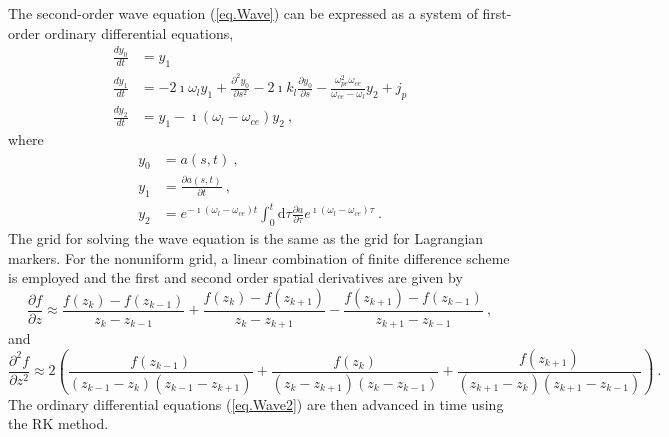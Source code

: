 \documentclass[times,12pt,3p,longtitle]{elsarticle}
\begin{document}
The second-order wave equation (\ref{eq.Wave}) can be expressed as a system of first-order ordinary differential equations,
\begin{equation}\label{eq.Wave2}
    \begin{aligned}
        \frac{d y_0}{d t} & = y_1 %
        \\
        \frac{d y_1}{d t} & =-2 \imath \omega_l y_1+\frac{\partial^2 y_0}{\partial s^2}-2 \imath k_l \frac{\partial y_0}{\partial s}- \frac{\omega_{pe}^2\omega_{ce}}{\omega_{ce}-\omega_l}y_{2} +j_p\\
        \frac{d y_2}{d t} & =y_1-\imath\left(\omega_l-\omega_{ce}\right) y_2~,
        \end{aligned}
\end{equation}
where 
\begin{equation}
    \begin{aligned}
        y_0 &= a(s,t)~,
        \\
        y_1 &= \frac{\partial a(s,t)}{\partial t}~,
        \\
        y_2 &= e^{-\imath(\omega_l-\omega_{ce})t} \int_0^t\mathrm{d}\tau \frac{\partial a}{\partial \tau} e^{\imath(\omega_l-\omega_{ce})\tau}~.
    \end{aligned}
\end{equation}
The grid for solving the wave equation is the same as the grid for Lagrangian markers.
For the nonuniform grid, 
a linear combination of finite difference scheme is employed and the first and second order spatial derivatives are given by 
\begin{equation}
    \frac{\partial f}{\partial z} \approx \frac{f(z_k) - f(z_{k-1})}{z_k-z_{k-1}} + \frac{f(z_k) - f(z_{k+1})}{z_k - z_{k+1}} - \frac{f(z_{k+1}) - f(z_{k-1})}{z_{k+1} - z_{k-1}}~,
\end{equation}
and
\begin{equation}
    \frac{\partial^2 f}{\partial z^2} \approx 2 \left(\frac{f(z_{k-1})}{(z_{k-1}-z_{k})(z_{k-1}-z_{k+1})}+\frac{f(z_{k})}{(z_k-z_{k+1})(z_k-z_{k-1})}+\frac{f(z_{k+1})}{(z_{k+1}-z_{k})(z_{k+1}-z_{k-1})}\right)~.
\end{equation}
The ordinary differential equations (\ref{eq.Wave2}) 
are then advanced in time using the RK method.
\end{document}
